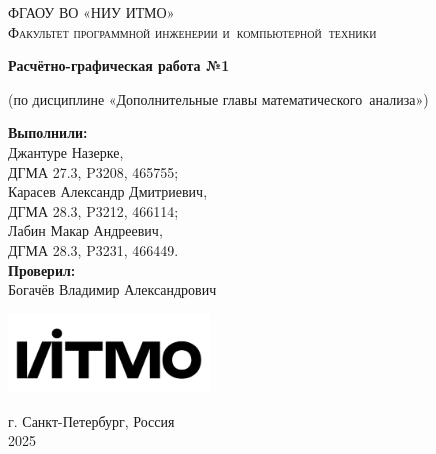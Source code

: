 \begin{titlepage}
    \begin{center}
        \large
        \textsc{ФГАОУ ВО «НИУ ИТМО»\\
        Факультет программной инженерии и~компьютерной~техники}
        \vspace*{4cm}
            
        \LARGE
        \textbf{Расчётно-графическая работа №1}
            
        \vspace{0.5cm}
        \large
        (по дисциплине «Дополнительные главы математического~анализа»)

        \vspace{1.5cm}

        \hfill\large
        \begin{minipage}{.55\textwidth}
        \textbf{Выполнили:}\\[2mm]
        Джантуре Назерке,\\
        ДГМА 27.3, P3208, 465755;\\
        Карасев Александр Дмитриевич,\\
        ДГМА 28.3, P3212, 466114;\\
        Лабин Макар Андреевич,\\
        ДГМА 28.3, P3231, 466449.\\[2mm]
        \textbf{Проверил:}\\[2mm]
        Богачёв Владимир Александрович
        \end{minipage}%
            
        \vfill
            
        \vspace{0.8cm}
            
        \includegraphics[width=0.4\textwidth]{itmo}
            
        \Large
        г. Санкт-Петербург, Россия\\
        2025
            
    \end{center}
\end{titlepage}